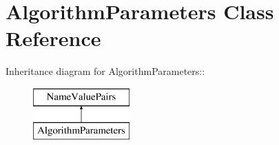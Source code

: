 \hypertarget{class_algorithm_parameters}{
\section{AlgorithmParameters Class Reference}
\label{class_algorithm_parameters}
}
Inheritance diagram for AlgorithmParameters::\begin{figure}[H]
\begin{center}
\leavevmode
\includegraphics[height=2cm]{class_algorithm_parameters}
\end{center}
\end{figure}
